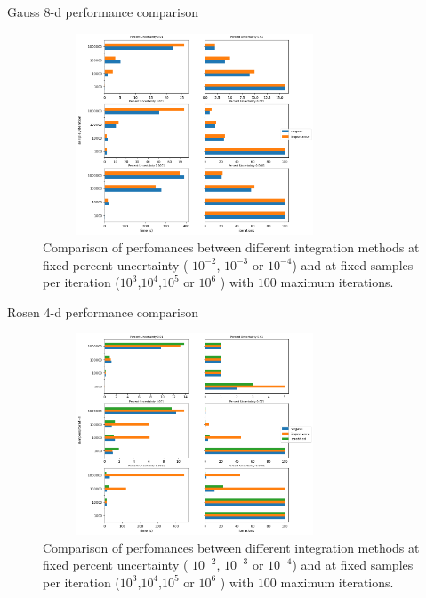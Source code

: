 \documentclass[t,handout,professionalfonts]{beamer}
\begin{document}
\begin{frame}{Gauss 8-d performance comparison}
	\tiny
	\vspace{-0.4cm}
	\begin{figure}
		\includegraphics[height=6cm,width=9cm]{../performance_plots/gauss8-d_no_stratified.png}
		\caption{Comparison of perfomances between different integration methods at fixed percent uncertainty ( $10^{-2}$, $10^{-3}$ or $10^{-4}$) and at fixed samples per iteration ($10^3$,$10^4$,$10^5$ or $10^6$ ) with $100$ maximum iterations.}
	\end{figure}
	
\end{frame}

\begin{frame}{Rosen 4-d performance comparison}
	\tiny
	\vspace{-0.4cm}
	\begin{figure}
		\includegraphics[height=6cm,width=9cm]{../performance_plots/rosen4-d.png}
		\caption{Comparison of perfomances between different integration methods at fixed percent uncertainty ( $10^{-2}$, $10^{-3}$ or $10^{-4}$) and at fixed samples per iteration ($10^3$,$10^4$,$10^5$ or $10^6$ ) with $100$ maximum iterations.}
	\end{figure}
	
\end{frame}
\end{document}
